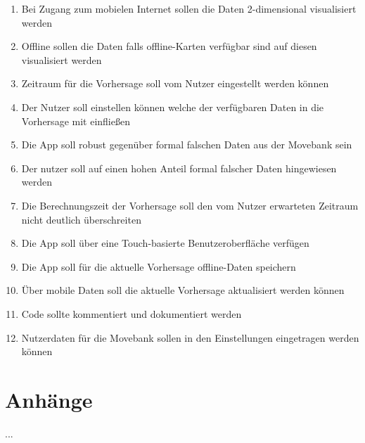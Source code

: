 \documentclass[12pt]{article} %
\begin{document}
\begin{enumerate}[(R1)]
		\item Bei Zugang zum mobielen Internet sollen die Daten 2-dimensional visualisiert werden
		\item Offline sollen die Daten falls offline-Karten verfügbar sind auf diesen visualisiert werden
		\item Zeitraum für die Vorhersage soll vom Nutzer eingestellt werden können
		\item Der Nutzer soll einstellen können welche der verfügbaren Daten in die Vorhersage mit einfließen
		\item Die App soll robust gegenüber formal falschen Daten aus der Movebank sein
		\item Der nutzer soll auf einen hohen Anteil formal falscher Daten hingewiesen werden
		\item Die Berechnungszeit der Vorhersage soll den vom Nutzer erwarteten Zeitraum nicht deutlich überschreiten
		\item Die App soll über eine Touch-basierte Benutzeroberfläche verfügen
		\item Die App soll für die aktuelle Vorhersage offline-Daten speichern
		\item Über mobile Daten soll die aktuelle Vorhersage aktualisiert werden können
		\item Code sollte kommentiert und dokumentiert werden
		\item Nutzerdaten für die Movebank sollen in den Einstellungen eingetragen werden können	
 	\end{enumerate}
	





\section{Anhänge}

...
\end{document}
